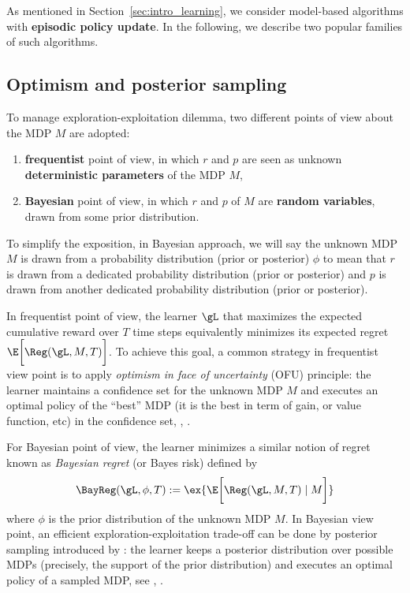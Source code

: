 As mentioned in Section~\ref{sec:intro_learning}, we consider model-based algorithms with \textbf{episodic policy update}.
In the following, we describe two popular families of such algorithms. 

\subsection{Optimism and posterior sampling}
\label{ch:rl:ssec:opt_post}

To manage exploration-exploitation dilemma, two different points of view about the MDP $M$ are adopted:
\begin{enumerate}
    \item \textbf{frequentist} point of view, in which $r$ and $p$ are seen as unknown \textbf{deterministic parameters} of the MDP $M$,
    \item \textbf{Bayesian} point of view, in which $r$ and $p$ of $M$ are \textbf{random variables}, drawn from some prior distribution.
\end{enumerate}
To simplify the exposition, in Bayesian approach, we will say the unknown MDP $M$ is drawn from a probability distribution (prior or posterior) $\phi$ to mean that $r$ is drawn from a dedicated probability distribution (prior or posterior) and $p$ is drawn from another dedicated probability distribution (prior or posterior).

In frequentist point of view, the learner $\gL$ that maximizes the expected cumulative reward over $T$ time steps equivalently minimizes its expected regret $\E\bigg[\Reg(\gL, M, T)\bigg]$.
To achieve this goal, a common strategy in frequentist view point is to apply \emph{optimism in face of uncertainty} (OFU) principle: the learner maintains a confidence set for the unknown MDP $M$ and executes an optimal policy of the
“best” MDP (it is the best in term of gain, or value function, etc) in the confidence set, \eg, \cite{ortner2020regret, bourel2020tightening, zhang2019regret, zanette2019tighter, fruit2018near, fruit2018efficient, jin2018q, fruit2017regret,azar2017minimax, bartlett2012regal, filippi2010optimism, jaksch2010near}.

For Bayesian point of view, the learner minimizes a similar notion of regret known as \emph{Bayesian regret} (or Bayes risk) defined by
\begin{equation}
    \label{eq:bayes_rg}
    \BayReg(\gL, \phi, T):=\ex{\E\bigg[\Reg(\gL, M, T) \mid M\bigg]}
\end{equation}
where $\phi$ is the prior distribution of the unknown MDP $M$.
In Bayesian view point, an efficient exploration-exploitation trade-off can be done by posterior sampling introduced by \cite{thompson1933likelihood}: the learner keeps a posterior distribution over possible MDPs (precisely, the support of the prior distribution) and executes an optimal policy of a sampled MDP, see \eg, \cite{osband2013more, gopalan2015thompson, ouyang2017learning}.

